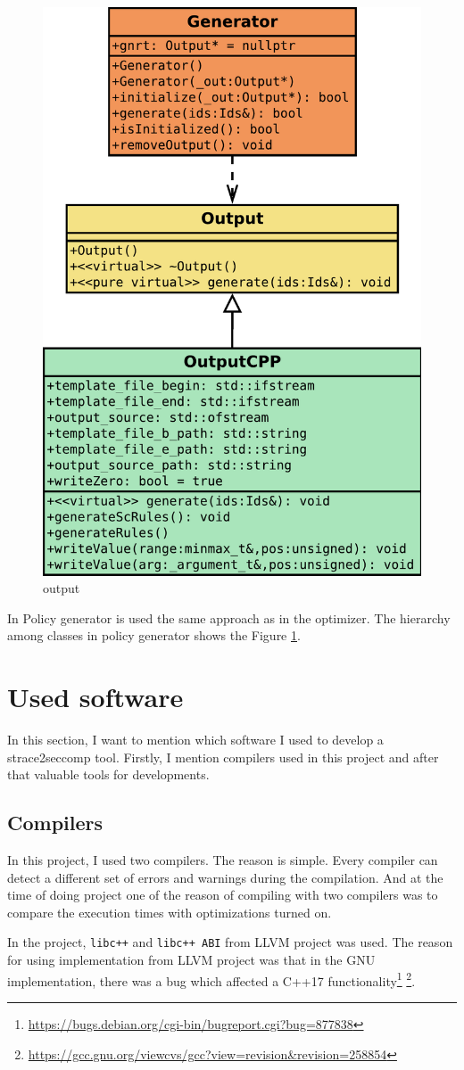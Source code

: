 \begin{figure}[H]
	\centering
	\includegraphics[width=0.5\linewidth]{obrazky-figures/class/output.pdf}
	\caption{output}
	\label{fig:class:output}
\end{figure}
\pagebreak

In Policy generator is used the same approach as in the optimizer. The hierarchy
among classes in policy generator shows the Figure \ref{fig:class:output}.

\section{Used software}
In this section, I want to mention which software I used to develop a strace2seccomp tool.
Firstly, I mention compilers used in this project and after that valuable tools for developments.

\subsection{Compilers}
\label{subsec:compilers}
In this project, I used two compilers. The reason is simple.
Every compiler can detect a different set of errors and warnings during the compilation.
And at the time of doing project one of the reason of compiling with two compilers
was to compare the execution times with optimizations turned on.

In the project, \texttt{libc++} and \texttt{libc++ ABI} from LLVM project was
used. The reason for using implementation from LLVM project was that in the GNU
implementation, there was a bug which affected a C++17
functionality\footnote{\url{https://bugs.debian.org/cgi-bin/bugreport.cgi?bug=877838}}
\footnote{\url{https://gcc.gnu.org/viewcvs/gcc?view=revision&revision=258854}}.

